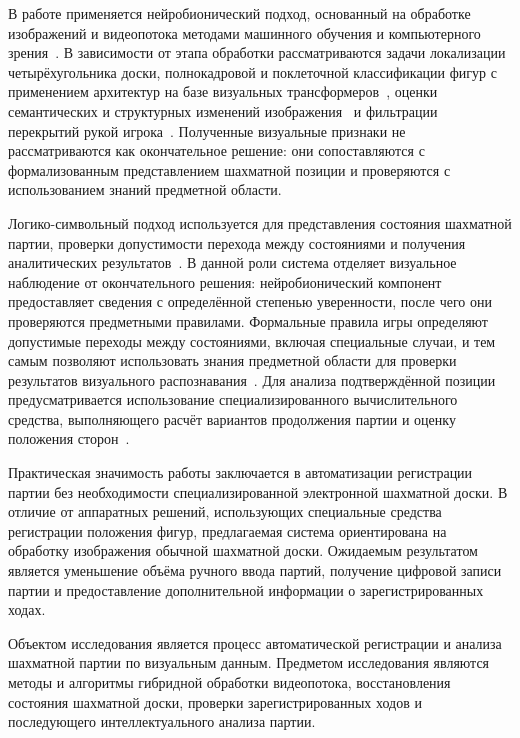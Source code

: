 В работе применяется нейробионический подход, основанный на обработке изображений и видеопотока методами машинного обучения и компьютерного зрения~\cite{Bradski2000,Wolflein2021}. В зависимости от этапа обработки рассматриваются задачи локализации четырёхугольника доски, полнокадровой и поклеточной классификации фигур с применением архитектур на базе визуальных трансформеров~\cite{Dosovitskiy2021}, оценки семантических и структурных изменений изображения~\cite{Oquab2024} и фильтрации перекрытий рукой игрока~\cite{Lugaresi2019}. Полученные визуальные признаки не рассматриваются как окончательное решение: они сопоставляются с формализованным представлением шахматной позиции и проверяются с использованием знаний предметной области.

Логико-символьный подход используется для представления состояния шахматной партии, проверки допустимости перехода между состояниями и получения аналитических результатов~\cite{Fiekas2024}. В данной роли система отделяет визуальное наблюдение от окончательного решения: нейробионический компонент предоставляет сведения с определённой степенью уверенности, после чего они проверяются предметными правилами. Формальные правила игры определяют допустимые переходы между состояниями, включая специальные случаи, и тем самым позволяют использовать знания предметной области для проверки результатов визуального распознавания~\cite{FIDE2023}. Для анализа подтверждённой позиции предусматривается использование специализированного вычислительного средства, выполняющего расчёт вариантов продолжения партии и оценку положения сторон~\cite{Shannon1950,Romstad2024}.

Практическая значимость работы заключается в автоматизации регистрации партии без необходимости специализированной электронной шахматной доски. В отличие от аппаратных решений, использующих специальные средства регистрации положения фигур, предлагаемая система ориентирована на обработку изображения обычной шахматной доски. Ожидаемым результатом является уменьшение объёма ручного ввода партий, получение цифровой записи партии и предоставление дополнительной информации о зарегистрированных ходах.

Объектом исследования является процесс автоматической регистрации и анализа шахматной партии по визуальным данным. Предметом исследования являются методы и алгоритмы гибридной обработки видеопотока, восстановления состояния шахматной доски, проверки зарегистрированных ходов и последующего интеллектуального анализа партии.

